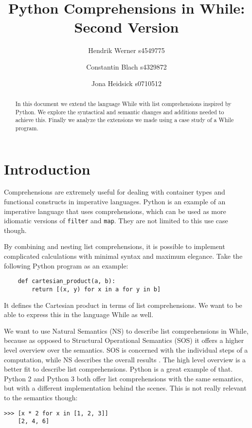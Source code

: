 \documentclass[12pt]{article}
\title{
    Python Comprehensions in While:\\
    Second Version
}
\author{
    Hendrik Werner s4549775
    \and Constantin Blach s4329872
    \and Jona Heidsick s0710512
}
\newcommand\mono\texttt
\begin{document}
\maketitle

\begin{abstract}
\noindent %
In this document we extend the language While with list comprehensions inspired by Python. We explore the syntactical and semantic changes and additions needed to achieve this. Finally we analyze the extensions we made using a case study of a While program.
\end{abstract}

\tableofcontents

\section{Introduction}
Comprehensions are extremely useful for dealing with container types and functional constructs in imperative languages. Python is an example of an imperative language that uses comprehensions, which can be used as more idiomatic versions of \mono{filter} and \mono{map}. They are not limited to this use case though.

By combining and nesting list comprehensions, it is possible to implement complicated calculations with minimal syntax and maximum elegance. Take the following Python program as an example:

\begin{lstlisting}
    def cartesian_product(a, b):
        return [(x, y) for x in a for y in b]
\end{lstlisting}

It defines the Cartesian product in terms of list comprehensions. We want to be able to express this in the language While as well.

We want to use Natural Semantics (NS) to describe list comprehensions in While, because as opposed to Structural Operational Semantics (SOS) it offers a higher level overview over the semantics. SOS is concerned with the individual steps of a computation, while NS describes the overall results \cite{wiley}. The high level overview is a better fit to describe list comprehensions. Python is a great example of that. Python 2 and Python 3 both offer list comprehensions with the same semantics, but with a different implementation behind the scenes. This is not really relevant to the semantics though:

\begin{lstlisting}[title=Python 2/3]
    >>> [x * 2 for x in [1, 2, 3]]
    [2, 4, 6]
\end{lstlisting}
\end{document}
